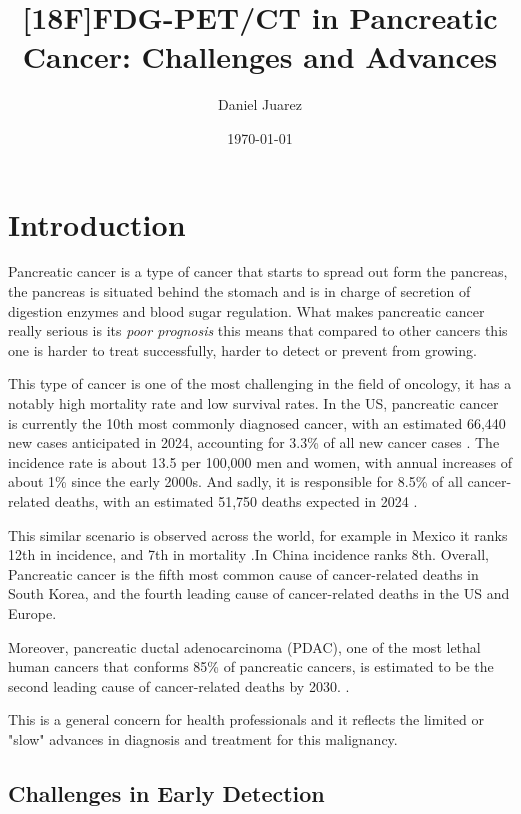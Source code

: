 \documentclass[11pt]{article} %
\title{[18F]FDG-PET/CT in Pancreatic Cancer: Challenges and Advances}
\author{Daniel Juarez}
\date{\today}
\begin{document}
\maketitle

\section{Introduction}

Pancreatic cancer is a type of cancer that starts to spread out form the pancreas, the pancreas is situated behind the stomach and is in charge of secretion of digestion enzymes and blood sugar regulation. What makes pancreatic cancer really serious is its \textit{poor prognosis} this means that compared to other cancers this one is harder to treat successfully, harder to detect or prevent from growing.

This type of cancer is one of the most challenging in the field of oncology, it has a notably high mortality rate and low survival rates. In the US, pancreatic cancer is currently the 10th most commonly diagnosed cancer, with an estimated 66,440 new cases anticipated in 2024, accounting for 3.3\% of all new cancer cases \cite{SEER2024}. The incidence rate is about 13.5 per 100,000 men and women, with annual increases of about 1\% since the early 2000s. And sadly, it is responsible for 8.5\% of all cancer-related deaths, with an estimated 51,750 deaths expected in 2024 \cite{SEER2024}.

This similar scenario is observed across the world, for example in Mexico it ranks 12th in incidence, and 7th in mortality \cite{GlobocanMexico}.In China incidence ranks 8th. Overall, Pancreatic cancer is the fifth most common cause of cancer-related deaths in South Korea, and the fourth leading cause of cancer-related deaths in the US and Europe. \cite{NCCNGuidelines}
 
 Moreover, pancreatic ductal adenocarcinoma (PDAC), one of the most lethal human cancers that conforms 85\% of pancreatic cancers, is estimated to be the second leading cause of cancer-related deaths by 2030. \cite{Li2022}\cite{Cancers2023}.

 This is a general concern for health professionals and it reflects the limited or "slow" advances in diagnosis and treatment for this malignancy.

\subsection{Challenges in Early Detection}
\end{document}
